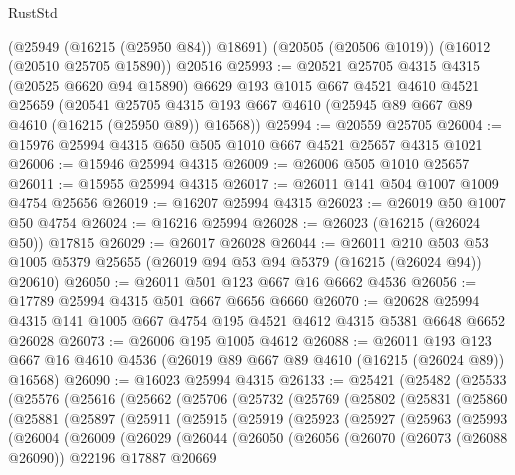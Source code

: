 \begin{lexlean}{RustStd}
\begin{coremodule}
    (@25949 (@16215 (@25950 @84)) @18691)
    (@20505 (@20506 @1019))
    (@16012 (@20510 @25705 @15890))
    @20516
@25993 := @20521
    @25705
    @4315
    @4315
    (@20525 @6620 @94 @15890)
    @6629
    @193
    @1015
    @667
    @4521
    @4610
    @4521
    @25659
    (@20541 @25705 @4315 @193 @667 @4610 (@25945 @89 @667 @89 @4610 (@16215 (@25950 @89)) @16568))
@25994 := @20559 @25705
@26004 := @15976 @25994 @4315 @650 @505 @1010 @667 @4521 @25657 @4315 @1021
@26006 := @15946 @25994 @4315
@26009 := @26006 @505 @1010 @25657
@26011 := @15955 @25994 @4315
@26017 := @26011 @141 @504 @1007 @1009 @4754 @25656
@26019 := @16207 @25994 @4315
@26023 := @26019 @50 @1007 @50 @4754
@26024 := @16216 @25994
@26028 := @26023 (@16215 (@26024 @50)) @17815
@26029 := @26017 @26028
@26044 := @26011
    @210
    @503
    @53
    @1005
    @5379
    @25655
    (@26019 @94 @53 @94 @5379 (@16215 (@26024 @94)) @20610)
@26050 := @26011 @501 @123 @667 @16 @6662 @4536
@26056 := @17789 @25994 @4315 @501 @667 @6656 @6660
@26070 := @20628 @25994 @4315 @141 @1005 @667 @4754 @195 @4521 @4612 @4315 @5381 @6648 @6652 @26028
@26073 := @26006 @195 @1005 @4612
@26088 := @26011
    @193
    @123
    @667
    @16
    @4610
    @4536
    (@26019 @89 @667 @89 @4610 (@16215 (@26024 @89)) @16568)
@26090 := @16023 @25994 @4315
@26133 := @25421
    (@25482
      (@25533
        (@25576
          (@25616
            (@25662
              (@25706
                (@25732
                  (@25769
                    (@25802
                      (@25831
                        (@25860
                          (@25881
                            (@25897
                              (@25911
                                (@25915
                                  (@25919
                                    (@25923
                                      (@25927
                                        (@25963
                                          (@25993
                                            (@26004
                                              (@26009
                                                (@26029
                                                  (@26044
                                                    (@26050
                                                      (@26056
                                                        (@26070
                                                          (@26073 (@26088 @26090))
                                                          @22196
                                                          @17887
                                                          @20669

\end{coremodule}
\end{lexlean}
